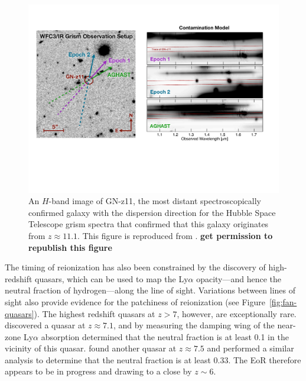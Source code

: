 \begin{bibunit}
\begin{figure}[t]
    \centering
    \includegraphics[width=\textwidth]{figures/chapter1/oesch-gn-z11}
    \caption{
        An $H$-band image of GN-z11, the most distant spectroscopically confirmed galaxy with the
        dispersion direction for the Hubble Space Telescope grism spectra that confirmed that this
        galaxy originates from $z\approx11.1$. This figure is reproduced from
        \citet{2016ApJ...819..129O}. \textbf{get permission to republish this figure}
    }
    \label{fig:oesch-galaxy}
\end{figure}

The timing of reionization has also been constrained by the discovery of high-redshift quasars,
which can be used to map the Ly$\alpha$ opacity---and hence the neutral fraction of hydrogen---along
the line of sight.  Variations between lines of sight also provide evidence for the patchiness of
reionization (see Figure~\ref{fig:fan-quasars}). The highest redshift quasars at $z>7$, however, are
exceptionally rare.  \citet{2011Natur.474..616M} discovered a quasar at $z\approx7.1$, and by
measuring the damping wing of the near-zone Ly$\alpha$ absorption determined that the neutral
fraction is at least 0.1 in the vicinity of this quasar.  \citet{2018Natur.553..473B} found another
quasar at $z\approx7.5$ and performed a similar analysis to determine that the neutral fraction is
at least 0.33. The EoR therefore appears to be in progress and drawing to a close by $z\sim 6$.


\end{bibunit}
